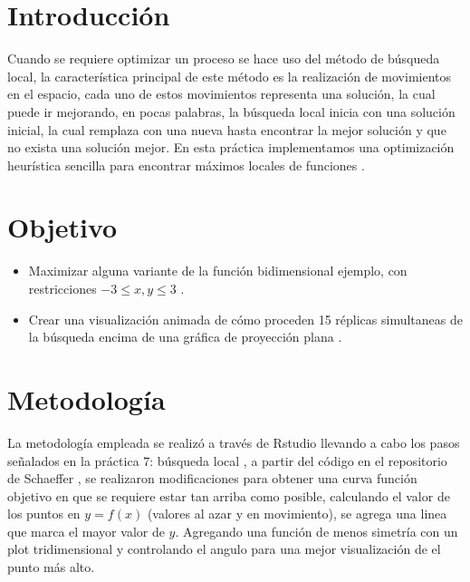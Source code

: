 \documentclass[a4paper]{article}
\begin{document}
\begin{justify}
\section{Introducción}
Cuando se requiere optimizar un proceso se hace uso del método de búsqueda local, la característica principal de este método es la realización de movimientos en el espacio, cada uno de estos movimientos representa una solución, la cual puede ir mejorando, en pocas palabras, la búsqueda local inicia con una solución inicial, la cual remplaza con una nueva hasta encontrar la mejor solución y que no exista una solución mejor. En esta práctica implementamos una optimización heurística sencilla para encontrar máximos locales de funciones \cite{p7}.
\section{Objetivo}
\begin{itemize}
\item Maximizar alguna variante de la función bidimensional ejemplo, con restricciones $-3 \leq x,y \leq 3$ \cite{p7}.
\item Crear una visualización animada de cómo proceden 15 réplicas simultaneas de la búsqueda encima de una gráfica de proyección plana \cite{p7}.
\end{itemize}

\section{Metodología}
La metodología empleada se realizó a través de Rstudio \cite{RStudio} llevando a cabo los pasos señalados en la práctica 7: búsqueda local \cite{p7}, a partir del código en el repositorio de Schaeffer \cite{GITSCHAEFFER}, se realizaron modificaciones para obtener una curva función objetivo en que se requiere estar tan arriba como posible, calculando el valor de los puntos en $y=f(x)$ (valores al azar y en movimiento), se agrega una linea que marca el mayor valor de $y$. Agregando una función de menos simetría con un plot tridimensional y controlando el angulo para una mejor visualización de el punto más alto.

\end{justify}
\end{document}
